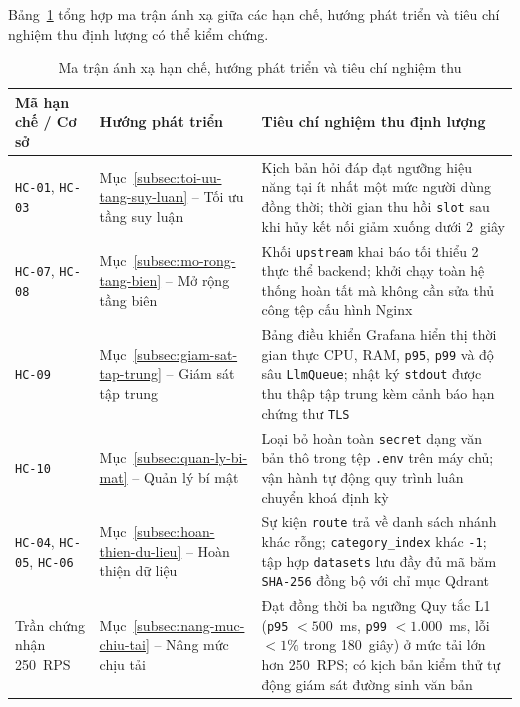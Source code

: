 Bảng~\ref{tab:anh-xa-han-che-nghiem-thu} tổng hợp ma trận ánh xạ giữa các hạn chế, hướng phát triển và tiêu chí nghiệm thu định lượng có thể kiểm chứng.

\begin{table}[htbp]
\centering
\caption{Ma trận ánh xạ hạn chế, hướng phát triển và tiêu chí nghiệm thu}
\label{tab:anh-xa-han-che-nghiem-thu}
\small
\begin{tabularx}{\textwidth}{
  >{\raggedright\arraybackslash}p{3.3cm}
  >{\raggedright\arraybackslash}p{4.3cm}
  >{\raggedright\arraybackslash}X
}
\toprule
\textbf{Mã hạn chế / Cơ sở} & \textbf{Hướng phát triển} & \textbf{Tiêu chí nghiệm thu định lượng} \\
\midrule
\texttt{HC-01}, \texttt{HC-03} & Mục~\ref{subsec:toi-uu-tang-suy-luan} -- Tối ưu tầng suy luận & Kịch bản hỏi đáp đạt ngưỡng hiệu năng tại ít nhất một mức người dùng đồng thời; thời gian thu hồi \texttt{slot} sau khi hủy kết nối giảm xuống dưới 2~giây \\
\midrule
\texttt{HC-07}, \texttt{HC-08} & Mục~\ref{subsec:mo-rong-tang-bien} -- Mở rộng tầng biên & Khối \texttt{upstream} khai báo tối thiểu 2 thực thể backend; khởi chạy toàn hệ thống hoàn tất mà không cần sửa thủ công tệp cấu hình Nginx \\
\midrule
\texttt{HC-09} & Mục~\ref{subsec:giam-sat-tap-trung} -- Giám sát tập trung & Bảng điều khiển Grafana hiển thị thời gian thực CPU, RAM, \texttt{p95}, \texttt{p99} và độ sâu \texttt{LlmQueue}; nhật ký \texttt{stdout} được thu thập tập trung kèm cảnh báo hạn chứng thư \texttt{TLS} \\
\midrule
\texttt{HC-10} & Mục~\ref{subsec:quan-ly-bi-mat} -- Quản lý bí mật & Loại bỏ hoàn toàn \texttt{secret} dạng văn bản thô trong tệp \texttt{.env} trên máy chủ; vận hành tự động quy trình luân chuyển khoá định kỳ \\
\midrule
\texttt{HC-04}, \texttt{HC-05}, \texttt{HC-06} & Mục~\ref{subsec:hoan-thien-du-lieu} -- Hoàn thiện dữ liệu & Sự kiện \texttt{route} trả về danh sách nhánh khác rỗng; \texttt{category\_index} khác \texttt{-1}; tập hợp \texttt{datasets} lưu đầy đủ mã băm \texttt{SHA-256} đồng bộ với chỉ mục Qdrant \\
\midrule
Trần chứng nhận 250~RPS & Mục~\ref{subsec:nang-muc-chiu-tai} -- Nâng mức chịu tải & Đạt đồng thời ba ngưỡng Quy tắc L1 (\texttt{p95} $< 500$~ms, \texttt{p99} $< 1.000$~ms, lỗi $< 1\%$ trong 180~giây) ở mức tải lớn hơn 250~RPS; có kịch bản kiểm thử tự động giám sát đường sinh văn bản \\
\bottomrule
\end{tabularx}
\end{table}
